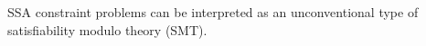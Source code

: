     SSA constraint problems can be interpreted as an unconventional type of
    satisfiability modulo theory (SMT).
    
%
%
%
%
%
